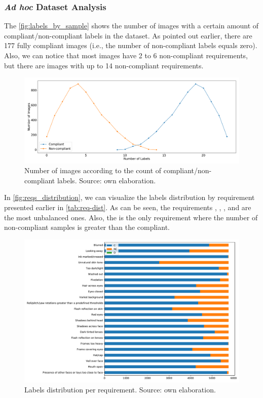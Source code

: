 \subsubsection{\textit{Ad hoc} Dataset Analysis}

The \autoref{fig:labels_by_sample} shows the number of images with a certain amount of compliant/non-compliant labels in the \adhoc dataset. As pointed out earlier, there are 177 fully compliant images (i.e., the number of non-compliant labels equals zero). Also, we can notice that most images have 2 to 6 non-compliant requirements, but there are images with up to 14 non-compliant requirements.

\begin{figure}[tb]
\centering
\includegraphics[width=\linewidth]{images/labels_by_sample.pdf}
\caption{Number of images according to the count of compliant/non-compliant labels. Source: own elaboration.}
\label{fig:labels_by_sample}
\end{figure}

In \autoref{fig:reqs_distribution}, we can visualize the labels distribution by requirement presented earlier in \autoref{tab:req-dist}. As can be seen, the requirements \inkmarked, \washedout, \framestooheavy, and \otherfacesortoys are the most unbalanced ones. Also, the \unnaturalskintone is the only requirement where the number of non-compliant samples is greater than the compliant.

\begin{figure}[tb]
\centering
\includegraphics[width=\linewidth]{images/reqs_distribution.pdf}
\caption{Labels distribution per requirement. Source: own elaboration.}
\label{fig:reqs_distribution}
\end{figure}

